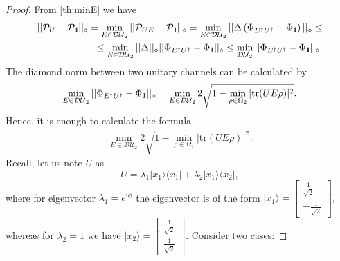 \documentclass[preprint,12pt, a4paper]{elsarticle}
\newcommand{\ket}[1]{\ensuremath{|#1\rangle}}
\newcommand{\bra}[1]{\ensuremath{\langle#1|}}
\newcommand{\ketbra}[2]{\ensuremath{\ket{#1}\bra{#2}}}
\newcommand{\1}{{\rm 1\hspace{-0.9mm}l}}
\newcommand{\diaguni}{\ensuremath{\mathcal{DU}}}
\newcommand{\tr}{\mathrm{tr}}
\begin{document}
\begin{proof} From \ref{th:minE} we have 
	\begin{equation}
	\begin{split}
	||\mathcal{P}_U - \mathcal{P}_{\1}||_\diamond =\min_{E \in \diaguni_2} ||\mathcal{P}_{UE} - \mathcal{P}_{\1}||_\diamond = \min_{E \in \diaguni_2}|| \Delta \left(\Phi_{E^\dagger U^\dagger} - \Phi_{\1} \right) ||_\diamond \le \\ \le \min_{E \in \diaguni_2} ||\Delta||_\diamond || \Phi_{E^\dagger U^\dagger} - \Phi_{\1}  ||_\diamond \le \min_{\diaguni_2}|| \Phi_{E^\dagger U^\dagger} - \Phi_{\1} ||_\diamond.
	\end{split}
	\end{equation}
The diamond norm between two unitary channels can be calculated by 
	\begin{equation}
	\min_{E \in \diaguni_2}||\Phi_{E^\dagger U^\dagger} - \Phi_\1||_\diamond  = \min_{E \in \diaguni_2} 2\sqrt{1 - \min_{\rho \in \Omega_2} |\tr(UE \rho )|^2}.
	\end{equation}
Hence,  it is enough to calculate the formula
\begin{equation}
\begin{split}
\min_{E \in \diaguni_2} 2\sqrt{1 - \min_{\rho \in \Omega_2} |\tr(UE \rho )|^2}.
\end{split}
\end{equation}
Recall, let us note $U$ as
\begin{equation}
U= \lambda_1 \ketbra{x_1}{x_1} + \lambda_2 \ketbra{x_1}{x_2}, 
\end{equation}
where  for eigenvector $\lambda_1 = e^{\mathbf{i} \phi}$ the eigenvector is of the form $\ket{x_1} = \left[\begin{array}{c}\frac{1}{\sqrt{2}}\\-\frac{1}{\sqrt{2}}\end{array}\right]$, whereas for  $\lambda_2 = 1$ we have $\ket{x_2} = \left[\begin{array}{c}\frac{1}{\sqrt{2}}\\\frac{1}{\sqrt{2}}\end{array}\right]$. 
Consider two cases:


\end{proof}
\end{document}
